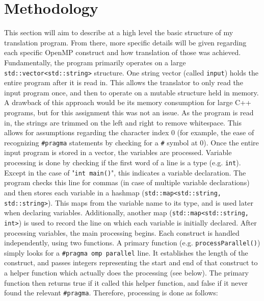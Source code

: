 \documentclass[]{article}
\begin{document}
\section{Methodology}
This section will aim to describe at a high level the basic structure of my translation program. From there, more specific details will be given regarding each specific OpenMP construct and how translation of those was achieved.
\newline \newline
Fundamentally, the program primarily operates on a large \texttt{std::vector<std::string>} structure. One string vector (called \texttt{input}) holds the entire program after it is read in. This allows the translator to only read the input program once, and then to operate on a mutable structure held in memory. A drawback of this approach would be its memory consumption for large C++ programs, but for this assignment this was not an issue.
\newline \newline
As the program is read in, the strings are trimmed on the left and right to remove whitespace. This allows for assumptions regarding the character index 0 (for example, the ease of recognizing \texttt{\#pragma} statements by checking for a \texttt{\#} symbol at 0). Once the entire input program is stored in a vector, the variables are processed. Variable processing is done by checking if the first word of a line is a type (e.g. \texttt{int}). Except in the case of "\texttt{int main()}", this indicates a variable declaration. The program checks this line for commas (in case of multiple variable declarations) and then stores each variable in a hashmap (\texttt{std::map<std::string, std::string>}). This maps from the variable name to its type, and is used later when declaring variables. Additionally, another map (\texttt{std::map<std::string, int>}) is used to record the line on which each variable is initially declared.
\newline \newline
After processing variables, the main processing begins. Each construct is handled independently, using two functions. A primary function (e.g. \texttt{processParallel()}) simply looks for a \texttt{\#pragma omp parallel} line. It establishes the length of the construct, and passes integers representing the start and end of that construct to a helper function which actually does the processing (see below). The primary function then returns true if it called this helper function, and false if it never found the relevant \texttt{\#pragma}. Therefore, processing is done as follows:
\newline

\end{document}

